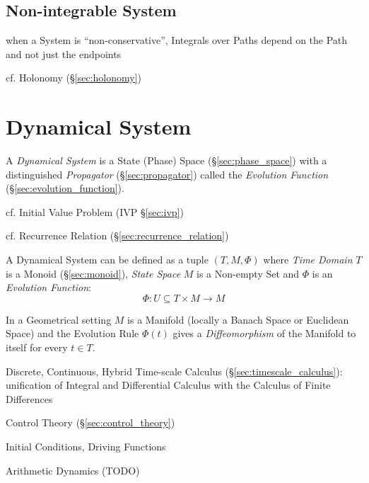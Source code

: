 \subsection{Non-integrable System}\label{sec:nonintegrable_system}

when a System is ``non-conservative'', Integrals over Paths depend on the Path
and not just the endpoints

cf. Holonomy (\S\ref{sec:holonomy})



\section{Dynamical System}\label{sec:dynamical_system}

A \emph{Dynamical System} is a State (Phase) Space (\S\ref{sec:phase_space})
with a distinguished \emph{Propagator} (\S\ref{sec:propagator}) called the
\emph{Evolution Function} (\S\ref{sec:evolution_function}).

\fist cf. Initial Value Problem (IVP \S\ref{sec:ivp})

\fist cf. Recurrence Relation (\S\ref{sec:recurrence_relation})

A Dynamical System can be defined as a tuple $(T,M,\Phi)$ where \emph{Time
  Domain} $T$ is a Monoid (\S\ref{sec:monoid}), \emph{State Space} $M$ is a
Non-empty Set and $\Phi$ is an \emph{Evolution Function}:
\[
  \Phi : U \subseteq T \times M \rightarrow M
\]

In a Geometrical setting $M$ is a Manifold (locally a Banach Space or Euclidean
Space) and the Evolution Rule $\Phi(t)$ gives a \emph{Diffeomorphism} of the
Manifold to itself for every $t \in T$. %

Discrete, Continuous, Hybrid \fist Time-scale Calculus
(\S\ref{sec:timescale_calculus}): unification of Integral and Differential
Calculus with the Calculus of Finite Differences

Control Theory (\S\ref{sec:control_theory})

Initial Conditions, Driving Functions


Arithmetic Dynamics (TODO)

